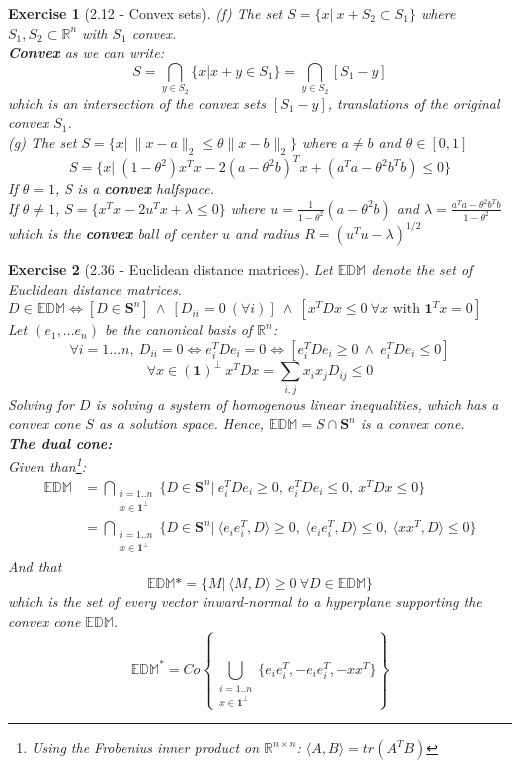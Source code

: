 \documentclass[11pt]{article}
\theoremstyle{exo}
\newtheorem*{exercise}{Exercise}
\newcommand{\R}{\mathbb{R}}
\newcommand{\1}{\mathbf{1}}
\newcommand{\0}{\mathbf{0}}
\begin{document}
\begin{exercise}[2.12 - Convex sets]
(f) The set $S=\{x|\:x+S_2\subset S_1\}$ where $S_1,S_2\subset\R^n$ with $S_1$ convex.\\
\textbf{Convex} as we can write:
\[S=\bigcap\limits_{y\in S_2}\{x|x+y\in S_1\}=\bigcap\limits_{y\in S_2}\left[S_1-y\right]\]
which is an intersection of the convex sets $[S_1-y]$, translations of the original convex $S_1$.\\
(g) The set $S=\{x|\:\|x-a\|_2\leq\theta\|x-b\|_2\}$ where $a\neq b$ and $\theta\in[0,1]$\\
\[S=\{x|\:(1-\theta^2)x^Tx-2(a-\theta^2b)^Tx+(a^Ta-\theta^2b^Tb)\leq0\}\]
If $\theta=1$, S is a \textbf{convex} halfspace.\\
If $\theta\neq 1$, $S=\{x^Tx-2u^Tx+\lambda\leq 0 \}$ where $u=\frac{1}{1-\theta^2}(a-\theta^2b)$ and $\lambda=\frac{a^Ta-\theta^2b^Tb}{1-\theta^2}$\\
which is the \textbf{convex} ball of center $u$ and radius $R=(u^Tu-\lambda)^{1/2}$
\end{exercise}

\begin{exercise}[2.36 - Euclidean distance matrices]
Let $\mathbb{EDM}$ denote the set of Euclidean distance matrices.\\
$D\in\mathbb{EDM}\iff [D\in\mathbf S^n] \:\wedge\:[D_{ii}=0\: (\forall i)]\: \wedge \: [x^TDx\leq0\:\forall x\text{ with } \mathbf{1}^Tx=0]$\\
Let $(e_1,...e_n)$ be the canonical basis of $\R^n$:
\[\forall i=1...n,\:D_{ii}=0\iff e_i^TDe_i=0\iff [e_i^TDe_i\geq0\:\wedge\:e_i^TDe_i\leq0]\]
\[\forall x\in (\mathbf 1)^{\perp}\:x^TDx=\sum_{i,j}x_ix_jD_{ij}\leq0\]
Solving for $D$ is solving a system of homogenous linear inequalities, which has a convex cone $S$ as a solution space. Hence, $\mathbb{EDM}=S\cap\mathbf S^n$ is a convex cone.\\
\textbf{The dual cone:}\\
Given than\footnote{Using the Frobenius inner product on $\R^{n\times n}$: $\langle A,B\rangle=tr(A^TB)$}:
\[
\begin{split}
\mathbb{EDM}&=\bigcap\limits_{\substack{i=1..n\\x\in\mathbf 1^\perp}}\{D\in\mathbf S^n|\:e_i^TDe_i\geq 0,\:e_i^TDe_i\leq 0,\:x^TDx\leq 0\}\\
&=\bigcap\limits_{\substack{i=1..n\\x\in\mathbf 1^\perp}}\{D\in\mathbf S^n|\:\langle e_ie_i^T,D\rangle\geq 0,\:\langle e_ie_i^T,D\rangle\leq 0,\:\langle xx^T,D\rangle\leq 0\}
\end{split}
\]
And that
\[\mathbb{EDM}*=\{M|\:\langle M,D\rangle\geq0\:\forall D\in\mathbb{EDM} \}\]
which is the set of every vector inward-normal to a hyperplane supporting the convex cone $\mathbb{EDM}$.\\
\[
\mathbb{EDM}^*=Co\left\{\bigcup\limits_{\substack{i=1..n\\x\in\mathbf 1^\perp}}\{e_ie_i^T,-e_ie_i^T,-xx^T\}\right\}
\]
\end{exercise}
\end{document}
